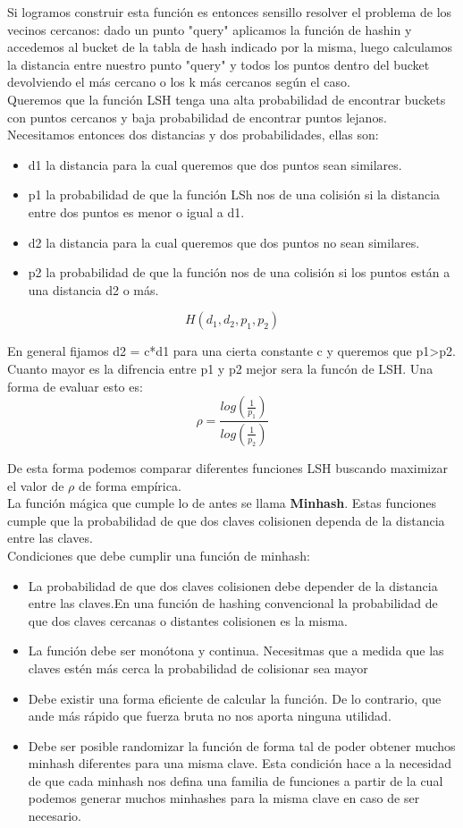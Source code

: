 \documentclass[titlepage,a4paper]{article}
\begin{document}
Si logramos construir esta función es entonces sensillo resolver el problema de los vecinos cercanos: dado un punto "query" aplicamos la función de hashin y accedemos al bucket de la tabla de hash indicado por la misma, luego calculamos la distancia entre nuestro punto "query"  y todos los puntos dentro del bucket devolviendo el más cercano o los k más cercanos según el caso. \\

Queremos que la función LSH tenga una alta probabilidad de encontrar buckets con puntos cercanos y baja probabilidad de encontrar puntos lejanos. Necesitamos entonces dos distancias y dos probabilidades, ellas son:
\begin{itemize}
\item d1 la distancia para la cual queremos que dos puntos sean similares. 
\item p1 la probabilidad de que la función LSh nos de una colisión si la distancia entre dos puntos es menor o igual a d1. 
\item d2 la distancia para la cual queremos que dos puntos no sean similares. 
\item p2 la probabilidad de que la función nos de una colisión si los puntos están a una distancia d2 o más. 
\end{itemize}

$$H(d_1, d_2, p_1, p_2)$$

En general fijamos d2 =  c*d1 para una cierta constante c y queremos que p1>p2. Cuanto mayor es la difrencia entre p1 y p2 mejor sera la funcón de LSH. Una forma de evaluar esto es:
$$\rho = \frac{log(\frac{1}{p_1})}{log(\frac{1}{p_2})}$$

De esta forma podemos comparar diferentes funciones LSH buscando maximizar el valor de $\rho$ de forma empírica. \\

La función mágica que cumple lo de antes se llama \textbf{Minhash}. Estas funciones cumple que la probabilidad de que dos claves colisionen dependa de la distancia entre las claves. \\

Condiciones que debe cumplir una función de minhash:
\begin{itemize}
\item La probabilidad de que dos claves colisionen debe depender de la distancia entre las claves.En una función de hashing convencional la probabilidad de que dos claves cercanas o distantes colisionen es la misma. 
\item La función debe ser monótona y continua. Necesitmas que a medida que las claves estén más cerca la probabilidad de colisionar sea mayor
\item Debe existir una forma eficiente de calcular la función. De lo contrario, que ande más rápido que fuerza bruta no nos aporta ninguna utilidad. 
\item Debe ser posible randomizar la función de forma tal de poder obtener muchos minhash diferentes para una misma clave. Esta condición hace a la necesidad de que cada minhash nos defina una familia de funciones a partir de la cual podemos generar muchos minhashes para la misma clave en caso de ser necesario. 
\end{itemize}
\end{document}
